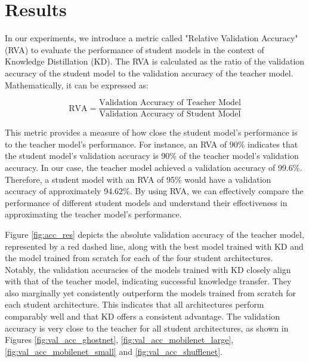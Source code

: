 \documentclass[11pt]{article}
\begin{document}
\section{Results}
In our experiments, we introduce a metric called "Relative Validation Accuracy" (RVA) to evaluate the performance of student models in the context of Knowledge Distillation (KD). The RVA is calculated as the ratio of the validation accuracy of the student model to the validation accuracy of the teacher model. Mathematically, it can be expressed as:

\begin{equation}
	\label{eq:RVA}
	\text{RVA} = \frac{\text{Validation Accuracy of Teacher Model}}{\text{Validation Accuracy of Student Model}}
\end{equation}

This metric provides a measure of how close the student model's performance is to the teacher model's performance. For instance, an RVA of 90\% indicates that the student model's validation accuracy is 90\% of the teacher model's validation accuracy. In our case, the teacher model achieved a validation accuracy of 99.6\%. Therefore, a student model with an RVA of 95\% would have a validation accuracy of approximately 94.62\%.
By using RVA, we can effectively compare the performance of different student models and understand their effectiveness in approximating the teacher model's performance.

Figure \ref{fig:acc_res} depicts the absolute validation accuracy of the teacher model, represented by a red dashed line, along with the best model trained with KD and the model trained from scratch for each of the four student architectures. Notably, the validation accuracies of the models trained with KD closely align with that of the teacher model, indicating successful knowledge transfer. They also marginally yet consistently outperform the models trained from scratch for each student architecture. This indicates that all architectures perform comparably well and that KD offers a consistent advantage. The validation accuracy is very close to the teacher for all student architectures, as shown in Figures \ref{fig:val_acc_ghostnet}, \ref{fig:val_acc_mobilenet_large}, \ref{fig:val_acc_mobilenet_small} and \ref{fig:val_acc_shufflenet}.
\end{document}
